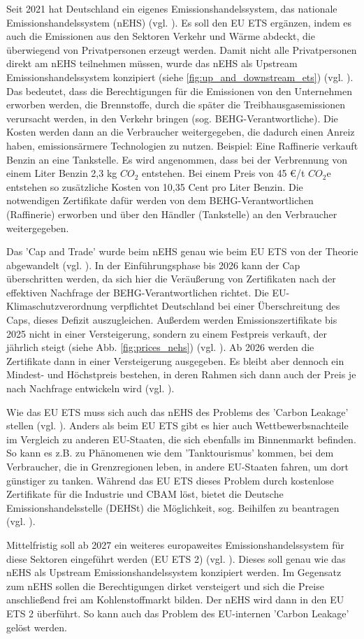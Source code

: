 Seit 2021 hat Deutschland ein eigenes Emissionshandelssystem, das nationale Emissionshandelssystem (nEHS) (vgl. \cite{dehst.2023}). Es soll den EU ETS ergänzen, indem es auch die Emissionen aus den Sektoren Verkehr und Wärme abdeckt, die überwiegend von Privatpersonen erzeugt werden.
Damit nicht alle Privatpersonen direkt am nEHS teilnehmen müssen, wurde das nEHS als Upstream Emissionshandelssystem konzipiert (siehe \ref{fig:up_and_downstream_ets}) (vgl. \cite{dehst.2023}).
Das bedeutet, dass die Berechtigungen für die Emissionen von den Unternehmen erworben werden, die Brennstoffe, durch die später die Treibhausgasemissionen verursacht werden, in den Verkehr bringen (sog. BEHG-Verantwortliche).
Die Kosten werden dann an die Verbraucher weitergegeben, die dadurch einen Anreiz haben, emissionsärmere Technologien zu nutzen. Beispiel: Eine Raffinerie verkauft Benzin an eine Tankstelle.
Es wird angenommen, dass bei der Verbrennung von einem Liter Benzin 2,3 kg $CO_2$ entstehen. Bei einem Preis von 45 €/t $CO_2$e entstehen so zusätzliche Kosten von 10,35 Cent pro Liter Benzin.
Die notwendigen Zertifikate dafür werden von dem BEHG-Verantwortlichen (Raffinerie) erworben und über den Händler (Tankstelle) an den Verbraucher weitergegeben.

Das 'Cap and Trade' wurde beim nEHS genau wie beim EU ETS von der Theorie abgewandelt (vgl. \cite{dehst.2023}).
In der Einführungsphase bis 2026 kann der Cap überschritten werden, da sich hier die Veräußerung von Zertifikaten nach der effektiven Nachfrage der BEHG-Verantwortlichen richtet.
Die EU-Klimaschutzverordnung verpflichtet Deutschland bei einer Überschreitung des Caps, dieses Defizit auszugleichen. 
Außerdem werden Emissionszertifikate bis 2025 nicht in einer Versteigerung, sondern zu einem Festpreis verkauft, der jährlich steigt (siehe Abb. \ref{fig:prices_nehs}) (vgl. \cite{dehst.2023}).
Ab 2026 werden die Zertifikate dann in einer Versteigerung ausgegeben.
Es bleibt aber dennoch ein Mindest- und Höchstpreis bestehen, in deren Rahmen sich dann auch der Preis je nach Nachfrage entwickeln wird (vgl. \cite{dehst.2023}).

Wie das EU ETS muss sich auch das nEHS des Problems des 'Carbon Leakage' stellen (vgl. \cite{dehst2.2023}). 
Anders als beim EU ETS gibt es hier auch Wettbewerbsnachteile im Vergleich zu anderen EU-Staaten, die sich ebenfalls im Binnenmarkt befinden.
So kann es z.B. zu Phänomenen wie dem 'Tanktourismus' kommen, bei dem Verbraucher, die in Grenzregionen leben, in andere EU-Staaten fahren, um dort günstiger zu tanken.
Während das EU ETS dieses Problem durch kostenlose Zertifikate für die Industrie und CBAM löst, bietet die Deutsche Emissionshandelsstelle (DEHSt) die Möglichkeit, sog. Beihilfen zu beantragen (vgl. \cite{dehst2.2023}).

Mittelfristig soll ab 2027 ein weiteres europaweites Emissionshandelssystem für diese Sektoren eingeführt werden (EU ETS 2) (vgl. \cite{ub.2023}).
Dieses soll genau wie das nEHS als Upstream Emissionshandelssystem konzipiert werden. Im Gegensatz zum nEHS sollen die Berechtigungen dirket versteigert und sich die Preise anschließend frei am Kohlenstoffmarkt bilden. 
Der nEHS wird dann in den EU ETS 2 überführt. So kann auch das Problem des EU-internen 'Carbon Leakage' gelöst werden.